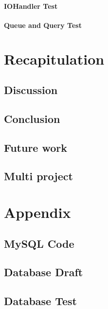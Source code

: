       \subsubsection{IOHandler Test}
      
      \subsubsection{Queue and Query Test}
      

\chapter{Recapitulation}
\label{recap}
  \section{Discussion}
    \label{sect:disc}
    
  
  \section{Conclusion}
    
  \section{Future work}
  	
  \section{Multi project} %
  	


\appendix
    \chapter{Appendix}
    \section{MySQL Code}
    \label{MySQLcode}
      
    \section{Database Draft}
      \label{sec:Databasedrafts}
      
    \section{Database Test}
      \label{app:dbTest}
      
